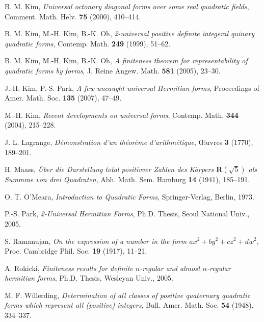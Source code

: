 \documentclass[a4paper,10pt,reqno]{amsart}
\begin{document}
\begin{thebibliography}{12}
B. M. Kim, \emph{Universal octonary diagonal forms over some real
quadratic fields}, Comment. Math. Helv. {\bf 75} (2000), 410--414.

B. M. Kim, M.-H. Kim, B.-K. Oh, \emph{2-universal positive definite
integeral quinary quadratic forms}, Contemp. Math. {\bf 249} (1999),
51--62.

B. M. Kim, M.-H. Kim, B.-K. Oh, \emph{A finiteness theorem for
representability of quadratic forms by forms}, J. Reine Angew. Math.
{\bf 581} (2005), 23--30.

  J.-H. Kim, P.-S. Park,
  \newblock \emph{A few uncaught universal Hermitian forms},
  \newblock Proceedings of Amer. Math. Soc. {\bf 135} (2007), 47--49.

  M.-H. Kim,
  \newblock \emph{Recent developments on universal forms},
  \newblock Contemp. Math. {\bf 344} (2004), 215--228.

  J. L. Lagrange,
  \newblock \emph{D\'emonstration d'un th\'eor\`eme d'arithm\'etique},
  \newblock \OE{}uvres {\bf 3} (1770), 189--201.

H. Maass, \emph{\"{U}ber die Darstellung total positivver Zahlen des
K\"{o}rpers $\mathbf{R}(\sqrt{5})$ als Summme von drei Quadraten},
Abh. Math. Sem. Hamburg {\bf 14} (1941), 185--191.

O. T. O'Meara, \emph{Introduction to Quadratic Forms},
Springer-Verlag, Berlin, 1973.

P.-S. Park, \emph{2-Universal Hermitian Forms}, Ph.D. Thesis,
Seoul National Univ., 2005.

  S. Ramanujan,
  \newblock \emph{On the expression of a number in the form $ax^2+by^2+cz^2+dw^2$},
  \newblock Proc. Cambridge Phil. Soc. {\bf 19} (1917), 11--21.

A. Rokicki, \emph{Finiteness results for definite $n$-regular and
almost $n$-regular hermitian forms}, Ph.D. Thesis, Wesleyan Univ.,
2005.

M. F. Willerding, \emph{Determination of all classes of positive
quaternary quadratic forms which represent all (positive) integers},
Bull. Amer. Math. Soc. {\bf 54} (1948), 334--337.

\end{thebibliography}
\end{document}
